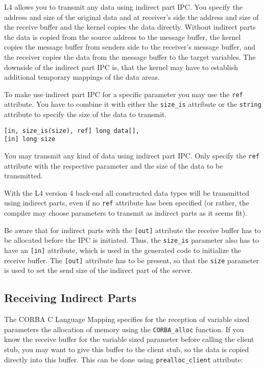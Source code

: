 L4 allows you to transmit any data using indirect part IPC. You specify the
address and size of the original data and at receiver's side the address and
size of the receive buffer and the kernel copies the data directly. Without
indirect parts the data is copied from the source address to the message
buffer, the kernel copies the message buffer from senders side to the
receiver's message buffer, and the receiver copies the data from the message
buffer to the target variables.  The downside of the indirect part IPC is,
that the kernel may have to establish additional temporary mappings of the
data areas.

To make \dice{} use indirect part IPC for a specific parameter you may use the
\verb|ref| attribute. You have to combine it with either the \verb|size_is|
attribute or the \verb|string| attribute to specify the size of the data to
transmit.

\begin{verbatim}
[in, size_is(size), ref] long data[],
[in] long size
\end{verbatim}

You may transmit any kind of data using indirect part IPC. Only specify the
\verb|ref| attribute with the respective parameter and the size of the data to
be transmitted.

With the L4 version 4 back-end all constructed data types will be transmitted
using indirect parts, even if no \verb|ref| attribute has been specified (or
rather, the compiler may choose parameters to transmit as indirect parts as it
seems fit).

Be aware that for indirect parts with the \verb|[out]| attribute the receive
buffer has to be allocated before the IPC is initiated.  Thus, the
\verb|size_is| parameter also has to have an \verb|[in]| attribute, which is
used in the generated code to initialize the receive buffer. The \verb|[out]|
attribute has to be present, so that the \verb|size| parameter is used to set
the send size of the indirect part of the server.

\subsection{Receiving Indirect Parts}

The CORBA C Language Mapping specifies for the reception of variable sized
parameters the allocation of memory using the \verb|CORBA_alloc| function.  If
you know the receive buffer for the variable sized parameter before calling
the client stub, you may want to give this buffer to the client stub, so the
data is copied directly into this buffer. This can be done using
\verb|prealloc_client| attribute:

